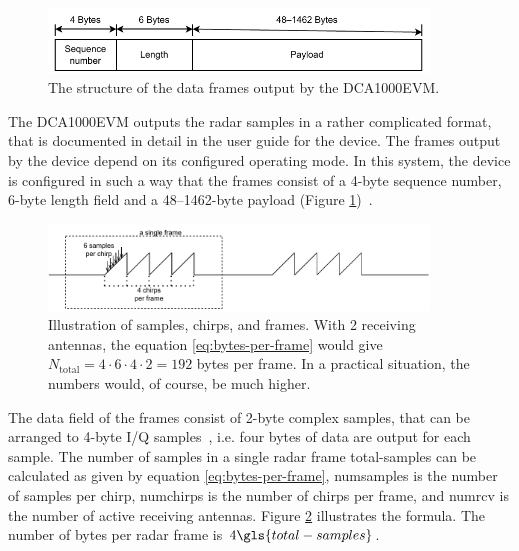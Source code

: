\begin{figure}[H]
    \centering
    \includegraphics[width=0.9\textwidth]{fig/2/radar-frame-bytes.pdf}
    \caption{The structure of the data frames output by the DCA1000EVM.}
    \label{fig:radar-frame-bytes}
\end{figure}

The DCA1000EVM outputs the radar samples in a rather complicated format,
that is documented in detail in the user guide for the device.
The frames output by the device depend on its configured operating mode.
In this system, the device is configured in such a way that the frames consist of a 4-byte sequence number,
6-byte length field and a 48--1462-byte payload (Figure \ref{fig:radar-frame-bytes})~\cite{dca1000-user-guide}.

\begin{figure}[H]
    \centering
    \includegraphics[width=0.9\textwidth]{fig/2/2-radar-sampling.pdf}
    \caption{Illustration of samples, chirps, and frames. With 2 receiving antennas,
    the equation \ref{eq:bytes-per-frame} would give $N_{\mathrm{total}} = 4\cdot6\cdot4\cdot2 = 192$ bytes per frame.
    In a practical situation, the numbers would, of course, be much higher.}
    \label{fig:2-radar-signal-sampling}
\end{figure}

The data field of the frames consist of 2-byte complex samples,
that can be arranged to 4-byte I/Q samples~\cite{dca1000-raw-data-capture},
i.e. four bytes of data are output for each sample.
The number of samples in a single radar frame \gls{total-samples} can be calculated as given by equation \ref{eq:bytes-per-frame},
\gls{numsamples} is the number of samples per chirp,
\gls{numchirps} is the number of chirps per frame,
and \gls{numrcv} is the number of active receiving antennas.
Figure \ref{fig:2-radar-signal-sampling} illustrates the formula.
The number of bytes per radar frame is $4 \gls{total-samples}$.

